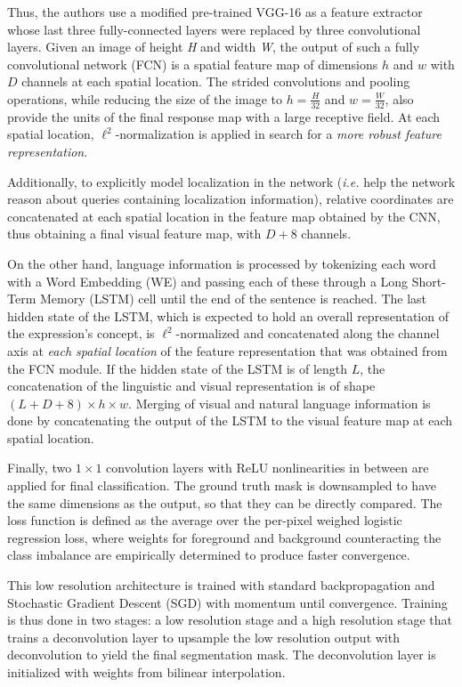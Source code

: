 Thus, the authors use a modified pre-trained VGG-16 \cite{DBLP:journals/corr/SimonyanZ14a} as a feature extractor whose last three fully-connected layers were replaced by three convolutional layers. Given an image of height \textit{H} and width \textit{W},  the output of such a fully convolutional network (FCN) is a spatial feature map of dimensions $h$ and $w$  with $D$ channels at each spatial location. The strided convolutions and pooling operations, while reducing the size of the image  to $h = \frac{H}{32}$ and $w = \frac{W}{32}$, also provide the units of the final response map with a large receptive field. At each spatial location, $\ell^2$-normalization is applied in search for a \textit{more robust feature representation}. 

Additionally, to explicitly model localization in the network (\textit{i.e.} help the network reason about queries containing localization information), relative coordinates are concatenated at each spatial location in the feature map obtained by the CNN, thus obtaining a final visual feature map, with $D + 8$ channels. 

On the other hand, language information is processed by tokenizing each word with a Word Embedding (WE) and passing each of these through a Long Short-Term Memory (LSTM) cell until the end of the sentence is reached. The last hidden state of the LSTM, which is expected to hold an overall representation of the expression's concept, is $\ell^2$-normalized and concatenated along the channel axis at \textit{each spatial location} of the feature representation that was obtained from the FCN module. If the hidden state of the LSTM is of length $L$, the concatenation of the linguistic and visual representation is of shape $(L + D + 8) \times h \times w$. Merging of visual and natural language information is done by concatenating the output of the LSTM to the visual feature map at each spatial location.

Finally, two $1\times1$ convolution layers with ReLU nonlinearities in between are applied for final classification. The ground truth mask is downsampled to have the same dimensions as the output, so that they can be directly compared. The loss function is defined as the average over the per-pixel weighed logistic regression loss, where weights for foreground and background counteracting the class imbalance are empirically determined to produce faster convergence. 

This low resolution architecture is trained with standard backpropagation and Stochastic Gradient Descent (SGD) with momentum until convergence.  Training is thus done in two stages: a low resolution stage and a high resolution stage that trains a deconvolution layer to upsample the low resolution output with deconvolution to yield the final segmentation mask. The deconvolution layer is initialized with weights from bilinear interpolation.



